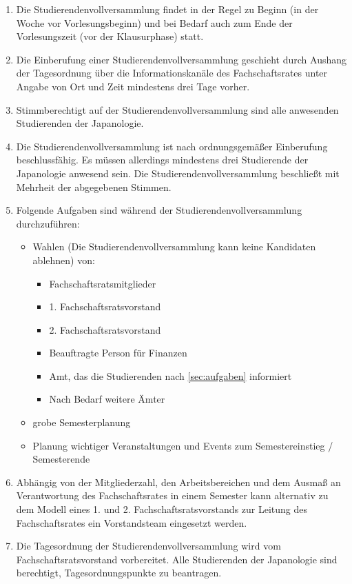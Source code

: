 \documentclass[12pt]{scrartcl}
\begin{document}
\begin{enumerate}
	\item Die Studierendenvollversammlung findet in der Regel zu Beginn (in der Woche vor Vorlesungsbeginn) und bei Bedarf auch zum Ende der Vorlesungszeit (vor der Klausurphase) statt.
	\item Die Einberufung einer Studierendenvollversammlung geschieht durch Aushang der Tagesordnung über die Informationskanäle des Fachschaftsrates unter Angabe von Ort und Zeit mindestens drei Tage vorher.
	\item Stimmberechtigt auf der Studierendenvollversammlung sind alle anwesenden Studierenden der Japanologie.
	\item Die Studierendenvollversammlung ist nach ordnungsgemäßer Einberufung beschlussfähig. Es müssen allerdings mindestens drei Studierende der Japanologie anwesend sein. Die Studierendenvollversammlung beschließt mit Mehrheit der abgegebenen Stimmen.
	\item\label{par:assembly:tasks} Folgende Aufgaben sind während der Studierendenvollversammlung durchzuführen:
	\begin{itemize}
		\item Wahlen (Die Studierendenvollversammlung kann keine Kandidaten ablehnen) von:
		\begin{itemize}
			\item Fachschaftsratsmitglieder
			\item 1. Fachschaftsratsvorstand
			\item 2. Fachschaftsratsvorstand
			\item Beauftragte Person für Finanzen
			\item Amt, das die Studierenden nach \ref{sec:aufgaben} informiert
			\item Nach Bedarf weitere Ämter
		\end{itemize}
		\item grobe Semesterplanung
		\item Planung wichtiger Veranstaltungen und Events zum Semestereinstieg / Semesterende
	\end{itemize}
	\item Abhängig von der Mitgliederzahl, den Arbeitsbereichen und dem Ausmaß an Verantwortung des Fachschaftsrates in einem Semester kann alternativ zu dem Modell eines 1. und 2. Fachschaftsratsvorstands zur Leitung des Fachschaftsrates ein Vorstandsteam eingesetzt werden.
	\item Die Tagesordnung der Studierendenvollversammlung wird vom Fachschaftsratsvorstand vorbereitet. Alle Studierenden der Japanologie sind berechtigt, Tagesordnungspunkte zu beantragen.

\end{enumerate}
\end{document}
